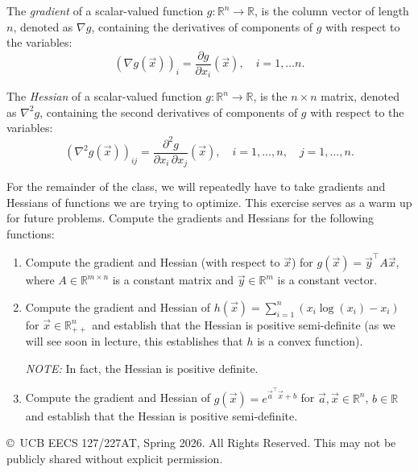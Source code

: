 \documentclass[10pt]{article}
\newcommand{\RR}{\mathbb{R}}
\begin{document}
The \emph{gradient} of a scalar-valued function $g \colon \RR^n \to \RR$, is the column vector of length $n$, denoted as $\nabla g$, containing the derivatives of components of $g$ with respect to the variables:
\begin{equation}
(\nabla g(\vec{x}))_i = \frac{\partial g}{\partial x_i}(\vec{x}), \quad i = 1, \ldots n.
\end{equation}

The \emph{Hessian} of a scalar-valued function $g \colon \RR^n \to \RR$, is the $n \times n$ matrix, denoted as $\nabla^2 g$, containing the second derivatives of components of $g$ with respect to the variables:
\begin{equation}
(\nabla^2 g(\vec{x}))_{ij} = \frac{\partial^2 g}{\partial x_i \, \partial x_j}(\vec{x}), \quad i = 1, \ldots, n, \quad j = 1, \ldots, n.
\end{equation}

For the remainder of the class, we will repeatedly have to take gradients and Hessians of functions we are trying to optimize. This exercise serves as a warm up for future problems. Compute the gradients and Hessians for the following functions:

\begin{enumerate}[label=(\alph*)]
\item Compute the gradient and Hessian (with respect to $\vec{x}$) for $g(\vec{x}) = \vec{y}^\top A \vec{x}$, where $A \in \RR^{m \times n}$ is a constant matrix and $\vec{y} \in \RR^m$ is a constant vector.

\vspace{5cm}

\item Compute the gradient and Hessian of $h(\vec{x}) = \displaystyle\sum_{i=1}^{n} (x_i \log(x_i) - x_i)$ for $\vec{x} \in \RR^n_{++}$ and establish that the Hessian is positive semi-definite (as we will see soon in lecture, this establishes that $h$ is a convex function).

\emph{NOTE:} In fact, the Hessian is positive definite.

\vspace{5cm}

\item Compute the gradient and Hessian of $g(\vec{x}) = e^{\vec{a}^\top \vec{x} + b}$ for $\vec{a}, \vec{x} \in \RR^n$, $b \in \RR$ and establish that the Hessian is positive semi-definite.
\end{enumerate}

\vfill
\begin{center}
\small \copyright\ UCB EECS 127/227AT, Spring 2026. All Rights Reserved. This may not be publicly shared without explicit permission.
\end{center}
\end{document}
